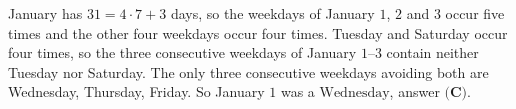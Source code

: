 January has $31=4\cdot7+3$ days, so the weekdays of January $1$, $2$ and $3$ occur five times and the other four weekdays occur four times. Tuesday and Saturday occur four times, so the three consecutive weekdays of January $1$--$3$ contain neither Tuesday nor Saturday. The only three consecutive weekdays avoiding both are Wednesday, Thursday, Friday. So January $1$ was a $\boxed{\text{Wednesday}}$, answer $\textbf{(C)}$.
